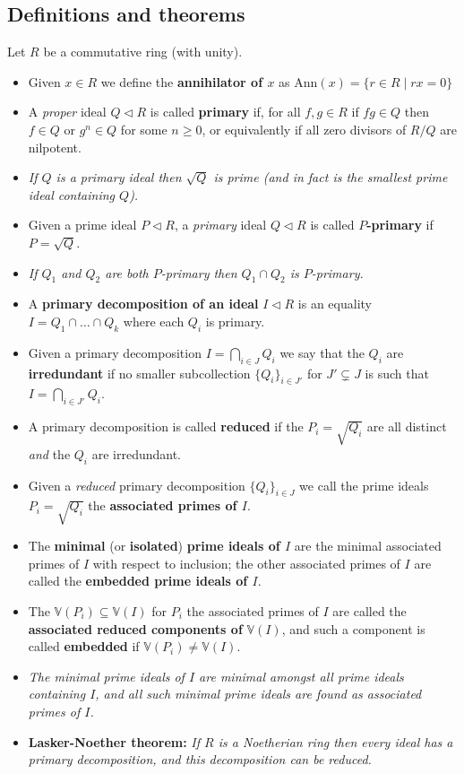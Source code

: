\documentclass[10pt]{article}
\newcommand{\van}{\mathbb{V}}
\begin{document}
        \subsection{Definitions and theorems}

            Let $R$ be a commutative ring (with unity).

            \begin{itemize}
                \item Given $x\in R$ we define the \textbf{annihilator of $x$} as $\mathrm{Ann}(x)=\{r\in R\mid rx=0\}$
                \item A \emph{proper} ideal $Q\triangleleft R$ is called \textbf{primary} if, for all $f,g\in R$ if $fg\in Q$ then $f\in Q$ or $g^n\in Q$ for some $n\geqslant0$, or equivalently if all zero divisors of $R/Q$ are nilpotent.
                \item \emph{If $Q$ is a primary ideal then $\sqrt{Q}$ is prime (and in fact is the smallest prime ideal containing $Q$).}
                \item Given a prime ideal $P\triangleleft R$, a \emph{primary} ideal $Q\triangleleft R$ is called \textbf{$P$-primary} if $P=\sqrt{Q}$.
                \item \emph{If $Q_1$ and $Q_2$ are both $P$-primary then $Q_1\cap Q_2$ is $P$-primary.}
                \item A \textbf{primary decomposition of an ideal} $I\triangleleft R$ is an equality $I=Q_1\cap\ldots\cap Q_k$ where each $Q_i$ is primary.
                \item Given a primary decomposition $I=\bigcap_{i\in J}Q_i$ we say that the $Q_i$ are \textbf{irredundant} if no smaller subcollection $\{Q_i\}_{i\in J'}$ for $J'\subsetneq J$ is such that $I=\bigcap_{i\in J'}Q_i$.
                \item A primary decomposition is called \textbf{reduced} if the $P_i=\sqrt{Q_i}$ are all distinct \emph{and} the $Q_i$ are irredundant.
                \item Given a \emph{reduced} primary decomposition $\{Q_i\}_{i\in J}$ we call the prime ideals $P_i=\sqrt{Q_i}$ the \textbf{associated primes of $I$}.
                \item The \textbf{minimal} (or \textbf{isolated}) \textbf{prime ideals of $I$} are the minimal associated primes of $I$ with respect to inclusion; the other associated primes of $I$ are called the \textbf{embedded prime ideals of $I$}.
                \item The $\van(P_i)\subseteq\van(I)$ for $P_i$ the associated primes of $I$ are called the \textbf{associated reduced components of} $\van(I)$, and such a component is called \textbf{embedded} if $\van(P_i)\neq\van(I)$.
                \item \emph{The minimal prime ideals of $I$ are minimal amongst all prime ideals containing $I$, and all such minimal prime ideals are found as associated primes of $I$.}
                \item \textbf{Lasker-Noether theorem:} \emph{If $R$ is a Noetherian ring then every ideal has a primary decomposition, and this decomposition can be reduced.}


\end{itemize}
\end{document}
